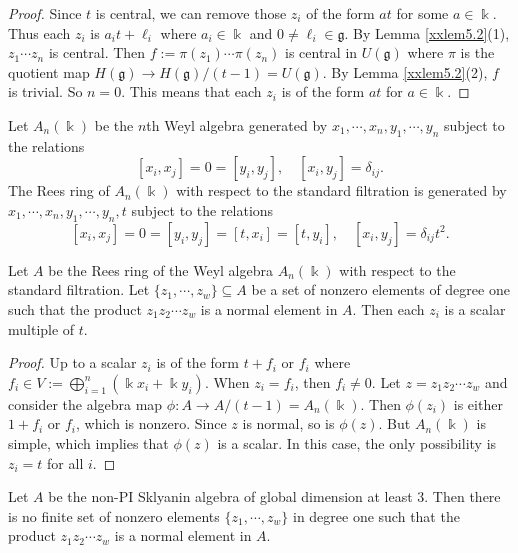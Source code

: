 \begin{proof} Since $t$ is central, we can remove those $z_i$ of the form
$at$ for some $a\in \Bbbk$. Thus each $z_i$ is $a_it+\ell_i$ where $a_i\in \Bbbk$ 
and $0\neq \ell_i\in {\mathfrak g}$. By Lemma \ref{xxlem5.2}(1), 
$z_1\cdots z_n$ is central. Then $f:=\pi(z_1)\cdots \pi(z_n)$ 
is central in $U({\mathfrak g})$ where $\pi$ is the quotient map 
$H({\mathfrak g})\to H({\mathfrak g})/(t-1)=U({\mathfrak g})$. 
By Lemma \ref{xxlem5.2}(2), $f$ is trivial. So $n=0$. This means that
each $z_i$ is of the form $at$ for $a\in \Bbbk$.
\end{proof}

Let $A_n(\Bbbk)$ be the $n$th Weyl algebra generated by
$x_1,\cdots,x_n, y_1,\cdots,y_n$ subject to the relations
$$[x_i,x_j]=0=[y_i,y_j], \quad [x_i,y_j]=\delta_{ij}.$$
The Rees ring of $A_n(\Bbbk)$ with respect to the 
standard filtration is generated by 
$x_1,\cdots,x_n, y_1,\cdots,y_n, t$ subject to the relations
$$[x_i,x_j]=0=[y_i,y_j]=[t,x_i]=[t,y_i], \quad [x_i,y_j]=\delta_{ij}t^2.$$

\begin{lemma}
\label{xxlem5.4} 
Let $A$ be the Rees ring of the Weyl algebra $A_n(\Bbbk)$ with respect to 
the standard filtration. Let $\{z_1,\cdots, z_w\}\subseteq A$ be a set of 
nonzero elements of degree one such that the product $z_1 z_2\cdots z_w$ 
is a normal element in $A$. Then each $z_i$ is a scalar multiple of $t$. 
\end{lemma}

\begin{proof} Up to a scalar $z_i$ is of the form $t+f_i$ or $f_i$ 
where $f_i\in V:=\bigoplus_{i=1}^n (\Bbbk x_i+\Bbbk y_i)$. When 
$z_i=f_i$, then $f_i\neq 0$. Let $z=z_1 z_2\cdots z_w$ and consider the
algebra map $\phi: A\to A/(t-1)=A_n(\Bbbk)$. Then $\phi(z_i)$ is either
$1+f_i$ or $f_i$, which is nonzero. Since $z$ is normal, so 
is $\phi(z)$. But $A_n(\Bbbk)$ is simple, which implies that 
$\phi(z)$ is a scalar. In this case, the only possibility 
is $z_i=t$ for all $i$. 
\end{proof}

\begin{lemma}
\label{xxlem5.5} 
Let $A$ be the 
non-PI Sklyanin algebra of global dimension at least 3.
Then there is no finite set of
nonzero elements $\{z_1,\cdots, z_w\}$ in degree one such that 
the product $z_1 z_2\cdots z_w$ is a normal element in $A$.
\end{lemma}

